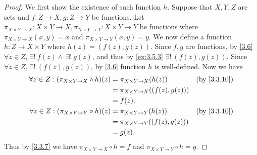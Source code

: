 \begin{proof}
  We first show the existence of such function \(h\).
  Suppose that \(X, Y, Z\) are sets and \(f : Z \to X, g : Z \to Y\) be functions.
  Let \(\pi_{X \times Y \to X} : X \times Y \to X, \pi_{X \times Y \to Y} : X \times Y \to Y\) be functions where \(\pi_{X \times Y \to X}(x, y) = x\) and \(\pi_{X \times Y \to Y}(x, y) = y\).
  We now define a function \(h : Z \to X \times Y\) where \(h(z) = (f(z), g(z))\).
  Since \(f, g\) are functions, by \cref{3.6} \(\forall z \in Z\), \(\exists!\ f(z) \land \ \exists!\ g(z)\), and thus by \cref{ex:3.5.3} \(\exists!\ (f(z), g(z))\).
  Since \(\forall z \in Z\), \(\exists!\ (f(z), g(z))\), by \cref{3.6} function \(h\) is well-defined.
  Now we have
  \begin{align*}
    \forall z \in Z : (\pi_{X \times Y \to X} \circ h)(z) & = \pi_{X \times Y \to X}(h(z))         &  & \by{3.3.10} \\
                                                          & = \pi_{X \times Y \to X}((f(z), g(z)))                  \\
                                                          & = f(z).                                                 \\
    \forall z \in Z : (\pi_{X \times Y \to Y} \circ h)(z) & = \pi_{X \times Y \to Y}(h(z))         &  & \by{3.3.10} \\
                                                          & = \pi_{X \times Y \to Y}((f(z), g(z)))                  \\
                                                          & = g(z).
  \end{align*}
  Thus by \cref{3.3.7} we have \(\pi_{X \times Y \to X} \circ h = f\) and \(\pi_{X \times Y \to Y} \circ h = g\).


\end{proof}
